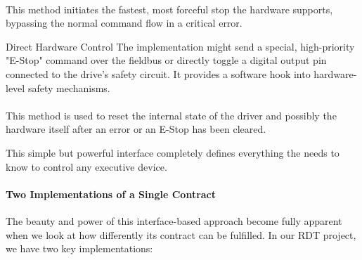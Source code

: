 \paragraph{}
This method initiates the fastest, most forceful stop the hardware supports, bypassing the normal command flow in a critical error.

\begin{tipbox}{Direct Hardware Control}
The implementation might send a special, high-priority "E-Stop" command over the fieldbus or directly toggle a digital output pin connected to the drive's safety circuit. It provides a software hook into hardware-level safety mechanisms.
\end{tipbox}


\paragraph{}
This method is used to reset the internal state of the driver and possibly the hardware itself after an error or an E-Stop has been cleared.


This simple but powerful interface completely defines everything the  needs to know to control any executive device.

\paragraph{Two Implementations of a Single Contract}
The beauty and power of this interface-based approach become fully apparent when we look at how differently its contract can be fulfilled. In our RDT project, we have two key implementations:

